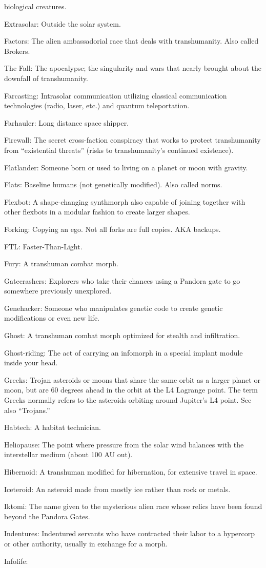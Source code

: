 biological creatures. \item Extrasolar: Outside the solar system. \item Factors: The alien ambassadorial race that deals with transhumanity. Also called Brokers. \item The Fall: The apocalypse; the singularity and wars that nearly brought about the downfall of transhumanity. \item Farcasting: Intrasolar communication utilizing classical communication technologies (radio, laser, etc.) and quantum teleportation. \item Farhauler: Long distance space shipper. \item Firewall: The secret cross-faction conspiracy that works to protect transhumanity from ``existential threats'' (risks to transhumanity's continued existence). \item Flatlander: Someone born or used to living on a planet or moon with gravity. \item Flats: Baseline humans (not genetically modified). Also called norms. \item Flexbot: A shape-changing synthmorph also capable of joining together with other flexbots in a modular fashion to create larger shapes. \item Forking: Copying an ego. Not all forks are full copies. AKA backups. \item FTL: Faster-Than-Light. \item Fury: A transhuman combat morph. \item Gatecrashers: Explorers who take their chances using a Pandora gate to go somewhere previously unexplored. \item Genehacker: Someone who manipulates genetic code to create genetic modifications or even new life. \item Ghost: A transhuman combat morph optimized for stealth and infiltration. \item Ghost-riding: The act of carrying an infomorph in a special implant module inside your head. \item Greeks: Trojan asteroids or moons that share the same orbit as a larger planet or moon, but are 60 degrees ahead in the orbit at the L4 Lagrange point. The term Greeks normally refers to the asteroids orbiting around Jupiter's L4 point. See also ``Trojans.'' \item Habtech: A habitat technician. \item Heliopause: The point where pressure from the solar wind balances with the interstellar medium (about 100 AU out). \item Hibernoid: A transhuman modified for hibernation, for extensive travel in space. \item Iceteroid: An asteroid made from mostly ice rather than rock or metals. \item Iktomi: The name given to the mysterious alien race whose relics have been found beyond the Pandora Gates. \item Indentures: Indentured servants who have contracted their labor to a hypercorp or other authority, usually in exchange for a morph. \item Infolife: 
